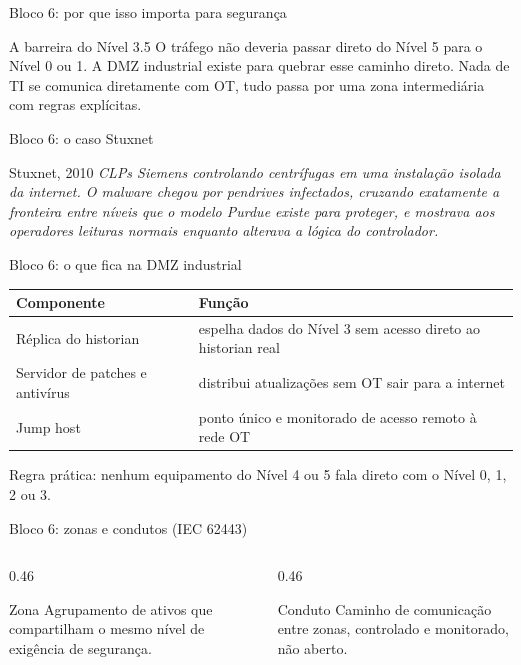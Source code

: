\documentclass[12pt, aspectratio=169]{beamer}
\newcommand{\tblhead}[1]{\textcolor{TextPrimary}{\textbf{#1}}}
\begin{document}
\begin{frame}{Bloco 6: por que isso importa para segurança}
  \begin{block}{A barreira do Nível 3.5}
    O tráfego não deveria passar direto do Nível 5 para o Nível 0 ou 1.
    A DMZ industrial existe para quebrar esse caminho direto.
    Nada de TI se comunica diretamente com OT, tudo passa por uma
    zona intermediária com regras explícitas.
  \end{block}
\end{frame}

\begin{frame}{Bloco 6: o caso Stuxnet}
  \begin{block}{Stuxnet, 2010}
    \itshape
    CLPs Siemens controlando centrífugas em uma instalação isolada da
    internet. O malware chegou por pendrives infectados, cruzando
    exatamente a fronteira entre níveis que o modelo Purdue existe
    para proteger, e mostrava aos operadores leituras normais enquanto
    alterava a lógica do controlador.
  \end{block}
\end{frame}

\begin{frame}{Bloco 6: o que fica na DMZ industrial}
  \begin{tabularx}{\textwidth}{@{}l X@{}}
    \rowcolor{PanelEdge}
    \tblhead{Componente} & \tblhead{Função} \\
    \midrule
    \rowcolor{PanelBg}
    Réplica do historian & espelha dados do Nível 3 sem acesso direto ao historian real \\
    \rowcolor{PanelBg}
    Servidor de patches e antivírus & distribui atualizações sem OT sair para a internet \\
    \rowcolor{PanelBg}
    Jump host & ponto único e monitorado de acesso remoto à rede OT \\
  \end{tabularx}

  \vspace{0.3cm}
  Regra prática: nenhum equipamento do Nível 4 ou 5 fala direto com o Nível 0, 1, 2 ou 3.
\end{frame}

\begin{frame}{Bloco 6: zonas e condutos (IEC 62443)}
  \begin{columns}[T, totalwidth=\textwidth]
    \begin{column}{0.46\textwidth}
      \begin{block}{Zona}
        Agrupamento de ativos que compartilham o mesmo nível de exigência de segurança.
      \end{block}
    \end{column}
    \begin{column}{0.46\textwidth}
      \begin{block}{Conduto}
        Caminho de comunicação entre zonas, controlado e monitorado, não aberto.
      \end{block}
    \end{column}
  \end{columns}
\end{frame}
\end{document}
